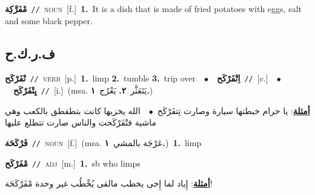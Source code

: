 \documentclass[10pt,a4paper,twoside]{article} %
\begin{document}
\begin{multicols}{2}
{\setlength\topsep{0pt}\textbf{\foreignlanguage{arabic}{مْفَرَّكِة}}\ {\color{gray}\texttt{//}\color{black}}\ \textsc{noun}\ [f.]\ \textbf{1.}~It is a dish that is made of fried potatoes with eggs, salt and some black pepper.\ } \vspace{2mm}

\vspace{-3mm}
\subsection*{\color{blue}\foreignlanguage{arabic}{ف.ر.ك.ح}\color{blue}{}} 

{\setlength\topsep{0pt}\textbf{\foreignlanguage{arabic}{تْفَرْكَح}}\ {\color{gray}\texttt{//}\color{black}}\ \textsc{verb}\ [p.]\ \textbf{1.}~limp  \textbf{2.}~tumble  \textbf{3.}~trip over\ \ $\bullet$\ \ \setlength\topsep{0pt}\textbf{\foreignlanguage{arabic}{اِتْفَرْكَح}}\ {\color{gray}\texttt{//}\color{black}}\ [c.]\ \ $\bullet$\ \ \setlength\topsep{0pt}\textbf{\foreignlanguage{arabic}{يِتْفَرْكَح}}\ {\color{gray}\texttt{//}\color{black}}\ [i.]\ \color{gray}(msa. \foreignlanguage{arabic}{يَتَعَثَّر}~\foreignlanguage{arabic}{\textbf{٢.}}  \foreignlanguage{arabic}{يَعْرُج}~\foreignlanguage{arabic}{\textbf{١.}})\color{black}\  \begin{flushright}\color{gray}\foreignlanguage{arabic}{\textbf{\underline{\foreignlanguage{arabic}{أمثلة}}}: يا حرام خبطتها سيارة وصارت تِتفَرْكَح\ $\bullet$\ \  الله يخزيها كانت بتطقطق بالكعب وهي ماشية فتْفَرْكَحت والناس صارت تتطلع عليها}\end{flushright}\color{black}} \vspace{2mm}

{\setlength\topsep{0pt}\textbf{\foreignlanguage{arabic}{فَرْكَحَة}}\ {\color{gray}\texttt{//}\color{black}}\ \textsc{noun}\ [f.]\ \color{gray}(msa. \foreignlanguage{arabic}{عَرْجَة بالمشي}~\foreignlanguage{arabic}{\textbf{١.}})\color{black}\ \textbf{1.}~limp\ } \vspace{2mm}

{\setlength\topsep{0pt}\textbf{\foreignlanguage{arabic}{مْفَرْكَح}}\ {\color{gray}\texttt{//}\color{black}}\ \textsc{adj}\ [m.]\ \textbf{1.}~sb who limps\  \begin{flushright}\color{gray}\foreignlanguage{arabic}{\textbf{\underline{\foreignlanguage{arabic}{أمثلة}}}: إِياد لما إِجى يخطب مالقى يُخْطُب غير وحدة مْفَرْكَحَة!}\end{flushright}\color{black}} \vspace{2mm}


\end{multicols}
\end{document}
